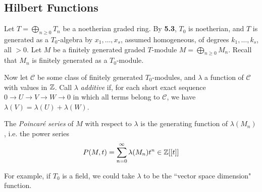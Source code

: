 \documentclass[10pt,a4paper]{article}
\begin{document}
\subsection{Hilbert Functions}
Let $T = \bigoplus_{n\geq 0}T_n$ be a noetherian graded ring. By \textbf{5.3}, $T_0$ is noetherian, and $T$ is generated as a $T_0$-algebra by $x_1, \ldots, x_s$, assumed homogeneous, of degrees $k_1, \ldots, k_s$, all $>0$. Let $M$ be a finitely generated graded $T$-module $M = \bigoplus_{n\geq 0}M_n$. Recall that $M_n$ is finitely generated as a $T_0$-module.

Now let $\mathscr{C}$ be some class of finitely generated $T_0$-modules, and $\lambda$ a function of $\mathscr{C}$ with values in $\mathbb{Z}$. Call $\lambda$ \emph{additive} if, for each short exact sequence $0 \to U \to V \to W \to 0$ in which all terms belong to $\mathscr{C}$, we have $\lambda(V) = \lambda(U) + \lambda(W)$.

\begin{definition}
  The \emph{Poincar\'e series} of $M$ with respect to $\lambda$ is the generating function of $\lambda(M_n)$, i.e. the power series
  \[P(M, t) = \sum_{n=0}^\infty \lambda(M_n)t^n \in \mathbb{Z}[[t]]\]
\end{definition}
For example, if $T_0$ is a field, we could take $\lambda$ to be the ``vector space dimension" function.
\end{document}
